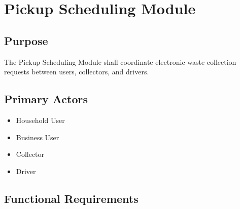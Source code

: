 \section{Pickup Scheduling Module}
\label{sec:pickup-module}

\subsection{Purpose}

The Pickup Scheduling Module shall coordinate electronic waste
collection requests between users, collectors, and drivers.

\subsection{Primary Actors}

\begin{itemize}
\item Household User
\item Business User
\item Collector
\item Driver
\end{itemize}

\subsection{Functional Requirements}


